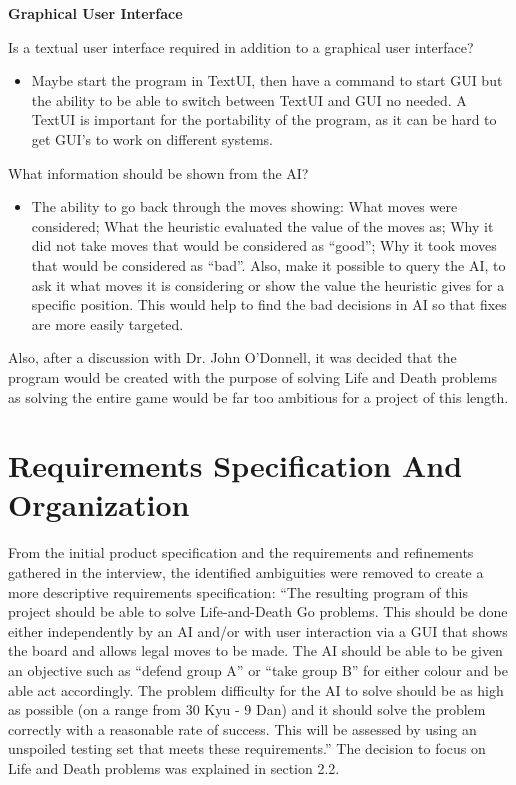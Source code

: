 \documentclass{l3proj}
\begin{document}
\textbf{Graphical User Interface}

Is a textual user interface required in addition to a graphical user interface?
\begin{itemize}
\item Maybe start the program in TextUI, then have a command to start GUI but the ability to be able to switch between TextUI and GUI no needed.  A TextUI is important for the portability of the program, as it can be hard to get GUI’s to work on different systems.
\end{itemize}
What information should be shown from the AI?
\begin{itemize}
\item The ability to go back through the moves showing: What moves were considered; What the heuristic evaluated the value of the moves as; Why it did not take moves that would be considered as “good”;  Why it took moves that would be considered as “bad”.  Also, make it possible to query the AI, to ask it what moves it is considering or show the value the heuristic gives for a specific position.  This would help to find the bad decisions in AI so that fixes are more easily targeted.
\end{itemize}

Also, after a discussion with Dr. John O’Donnell, it was decided that the program would be created with the purpose of solving Life and Death problems as solving the entire game would be far too ambitious for a project of this length. 

\section{Requirements Specification And Organization}

From the initial product specification and the requirements and refinements gathered in the interview, the identified ambiguities were removed to create a more descriptive requirements specification:  “The resulting program of this project should be able to solve Life-and-Death Go problems. This should be done either independently by an AI and/or with user interaction via a GUI that shows the board and allows legal moves to be made. The AI should be able to be given an objective such as “defend group A” or “take group B” for either colour and be able act accordingly. The problem difficulty for the AI to solve should be as high as possible (on a range from 30 Kyu - 9 Dan) and it should solve the problem correctly with a reasonable rate of success. This will be assessed by using an unspoiled testing set that meets these requirements.”  The decision to focus on Life and Death problems was explained in section 2.2.
\end{document}
